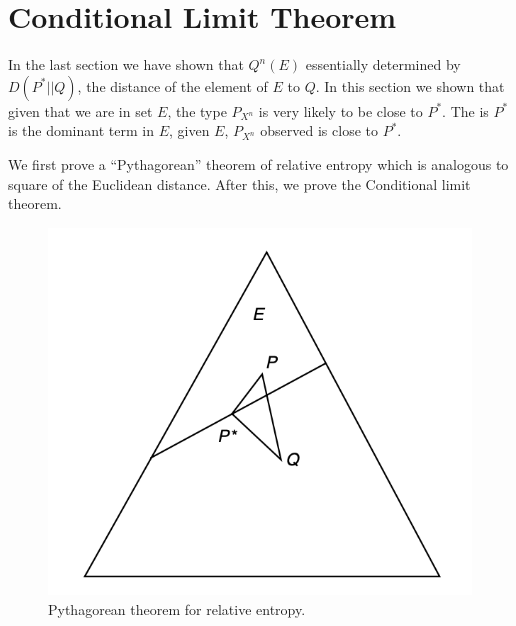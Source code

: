 \documentclass{article}
\begin{document}
\section{Conditional Limit Theorem}\label{sec:clt}
In the last section we have shown that $Q^n(E)$ essentially determined by $D\left(P^{*}|| Q\right)$, the distance of the  element of $E$ to $Q$. In this section we shown that given that we are in set $E$, the type  $P_{X^n}$ is very likely to be close to $P^{*}$. The  is $P^*$ is the dominant term in $E$, given $E$, $P_{X^n}$ observed is close to $P^*$. 

We first prove a ``Pythagorean'' theorem of relative entropy which is  analogous to square of the Euclidean distance. After this, we prove the Conditional limit theorem. 
\begin{figure}[ht]
 \centering
 \includegraphics[width=0.5\linewidth]{Figs/fig4.png}
\centering
\caption{Pythagorean theorem for relative entropy.}
		\label{ld:fig4}
\end{figure}
\end{document}
